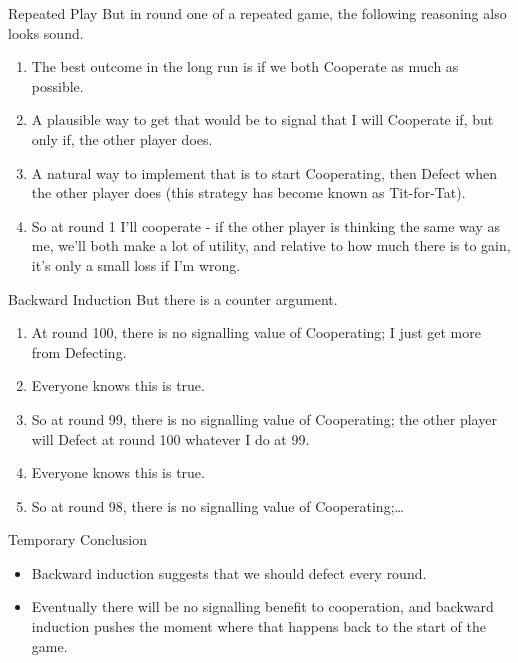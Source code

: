 \documentclass[
  ignorenonframetext,
]{beamer}
\providecommand{\tightlist}{%
  \setlength{\itemsep}{0pt}\setlength{\parskip}{0pt}}
\begin{document}
\begin{frame}{Repeated Play}
\protect\hypertarget{repeated-play}{}
But in round one of a repeated game, the following reasoning also looks
sound.

\begin{enumerate}
\tightlist
\item
  The best outcome in the long run is if we both Cooperate as much as
  possible.
\item
  A plausible way to get that would be to signal that I will Cooperate
  if, but only if, the other player does.
\item
  A natural way to implement that is to start Cooperating, then Defect
  when the other player does (this strategy has become known as
  Tit-for-Tat).
\item
  So at round 1 I'll cooperate - if the other player is thinking the
  same way as me, we'll both make a lot of utility, and relative to how
  much there is to gain, it's only a small loss if I'm wrong.
\end{enumerate}
\end{frame}

\begin{frame}{Backward Induction}
\protect\hypertarget{backward-induction}{}
But there is a counter argument.

\begin{enumerate}
\tightlist
\item
  At round 100, there is no signalling value of Cooperating; I just get
  more from Defecting.
\item
  Everyone knows this is true.
\item
  So at round 99, there is no signalling value of Cooperating; the other
  player will Defect at round 100 whatever I do at 99.
\item
  Everyone knows this is true.
\item
  So at round 98, there is no signalling value of Cooperating;\ldots{}
\end{enumerate}
\end{frame}

\begin{frame}{Temporary Conclusion}
\protect\hypertarget{temporary-conclusion}{}
\begin{itemize}
\tightlist
\item
  Backward induction suggests that we should defect every round.
\item
  Eventually there will be no signalling benefit to cooperation, and
  backward induction pushes the moment where that happens back to the
  start of the game.
\end{itemize}
\end{frame}
\end{document}
